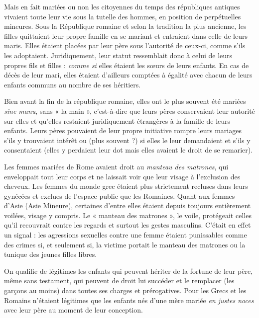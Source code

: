 Mais en fait mariées ou non les citoyennes du temps des républiques antiques vivaient toute leur vie sous la
tutelle des hommes, en position de perpétuelles mineures.
Sous la République romaine et selon la tradition la plus ancienne,
les filles quittaient leur propre famille en se mariant et entraient dans celle
de leurs maris. Elles étaient placées par leur père sous l'autorité de
ceux-ci, comme s'ils les adoptaient. Juridiquement, leur statut ressemblait donc
à celui de leurs propres fils et filles : \emph{comme si} elles étaient les sœurs de
leurs enfants. En cas de décès de leur mari, elles étaient d'ailleurs comptées
à égalité avec chacun de leurs enfants
communs au nombre de ses héritiers. 

Bien avant la fin de la république romaine, elles ont le
plus souvent été mariées \emph{sine manu}, sans « la main », c'est-à-dire
que leurs pères conservaient leur autorité sur elles  et
qu'elles restaient juridiquement étrangères à la famille de leurs enfants.
Leurs pères pouvaient de leur propre initiative rompre leurs mariages s'ils y trouvaient intérêt ou (plus souvent ?) si elles le leur demandaient
et s'ils y consentaient (elles y perdaient leur dot mais elles avaient le droit de se remarier). 



Les femmes mariées de Rome avaient droit au \emph{manteau des matrones},
qui enveloppait tout leur corps et ne laissait voir que leur visage à l'exclusion
des cheveux. Les femmes du monde grec étaient plus strictement
recluses dans leurs gynécées et exclues de l'espace public que les Romaines.
Quant aux femmes d'Asie (Asie Mineure), certaines d'entre elles
étaient depuis toujours entièrement voilées, visage y compris. Le
« manteau des matrones », le voile, protégeait celles qu'il recouvrait
contre les regards et surtout les gestes masculins. C'était en effet un signal :
les agressions sexuelles contre une femme étaient punissables
comme des crimes si, et seulement si, la victime portait le manteau des
matrones ou la tunique des jeunes filles libres.

On qualifie de légitimes les enfants qui peuvent hériter de la fortune
de leur père, même sans testament, qui peuvent de droit lui succéder et le
remplacer (les garçons au moins) dans toutes ses charges et prérogatives.
Pour les Grecs et les Romains n'étaient légitimes que les enfants nés d'une
mère mariée \emph{en justes noces} avec leur père au moment de leur conception.

